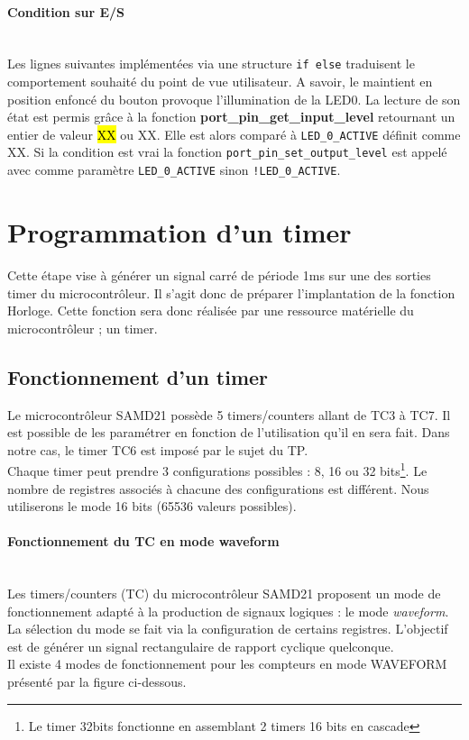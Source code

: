 \documentclass[a4paper]{article}
\begin{document}
	\paragraph{Condition sur E/S}
	~~\\
	Les lignes suivantes implémentées via une structure \texttt{if else} traduisent le comportement souhaité du point de vue utilisateur. A savoir, le maintient en position enfoncé du bouton provoque l'illumination de la LED0. La lecture de son état est permis grâce à la fonction \textbf{port\_pin\_get\_input\_level} retournant un entier de valeur \hl{XX} ou XX. Elle est alors comparé à \texttt{LED\_0\_ACTIVE} définit comme XX. Si la condition est vrai la fonction \texttt{port\_pin\_set\_output\_level} est appelé avec comme paramètre \texttt{LED\_0\_ACTIVE} sinon \texttt{!LED\_0\_ACTIVE}.
	
	
	\newpage
	\section{Programmation d'un timer}
	Cette étape vise à générer un signal carré de période 1ms sur une des sorties timer du microcontrôleur. Il s'agit donc de préparer l'implantation de la fonction Horloge. Cette fonction sera donc réalisée par une ressource matérielle du microcontrôleur ; un timer.
	\subsection{Fonctionnement d'un timer}
	Le microcontrôleur SAMD21 possède 5 timers/counters allant de TC3 à TC7. Il est possible de les paramétrer en fonction de l’utilisation qu’il en sera fait. Dans notre cas, le timer TC6 est imposé par le sujet du TP.\\
	Chaque timer peut prendre 3 configurations possibles : 8, 16 ou 32 bits\footnote{Le timer 32bits fonctionne en assemblant 2 timers 16 bits en cascade}. Le nombre de registres associés à chacune des configurations est différent. Nous utiliserons le mode 16 bits (65536 valeurs possibles).  \\
	\paragraph{Fonctionnement du TC en mode waveform}
	~~\\
	Les timers/counters (TC) du microcontrôleur SAMD21 proposent un mode de fonctionnement adapté à la production de signaux logiques : le mode {\sl waveform}. La sélection du mode se fait via la configuration de certains registres. L'objectif est de générer un signal rectangulaire de rapport cyclique quelconque. \\
	Il existe 4 modes de fonctionnement pour les compteurs en mode WAVEFORM présenté par la figure ci-dessous. \\
	
\end{document}
